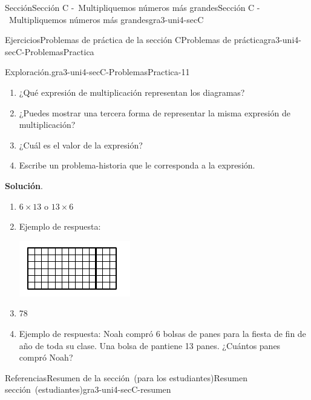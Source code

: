 \documentclass[oneside,10pt,]{article}
\newcommand{\blocktitlefont}{\relax}
\begin{document}
\begin{sectionptx}{Sección}{Sección C -~Multipliquemos números más grandes}{}{Sección C -~Multipliquemos números más grandes}{}{}{gra3-uni4-secC}
\begin{exercises-subsection}{Ejercicios}{Problemas de práctica de la sección C}{}{Problemas de práctica}{}{}{gra3-uni4-secC-ProblemasPractica}
\begin{divisionexercise}{9}{Exploración.}{}{gra3-uni4-secC-ProblemasPractica-11}
\begin{sidebyside}{2}{0.025}{0.025}{0.05}
\begin{sbspanel}{0.45}
\end{sbspanel}%
\end{sidebyside}%
%
\begin{enumerate}[label={(\alph*)}]
\item{}¿Qué expresión de multiplicación representan los diagramas?%
\item{}¿Puedes mostrar una tercera forma de representar la misma expresión de multiplicación?%
\item{}¿Cuál es el valor de la expresión?%
\item{}Escribe un problema-historia que le corresponda a la expresión.%
\end{enumerate}
\par\smallskip%
\noindent\textbf{\blocktitlefont Solución}.\hypertarget{gra3-uni4-secC-ProblemasPractica-11-3}{}\quad{}%
\begin{enumerate}[label={(\alph*)}]
\item{}\(6 \times 13\) o \(13 \times 6\)%
\item{}Ejemplo de respuesta:%
\begin{image}{0}{1}{0}{}%
\includegraphics[width=\linewidth]{external/svg-source/tikz-file-152442.pdf}
\end{image}%
\item{}78%
\item{}Ejemplo de respuesta: Noah compró 6 bolsas de panes para la fiesta de fin de año de toda su clase. Una bolsa de pantiene 13 panes. ¿Cuántos panes compró Noah?%
\end{enumerate}
\end{divisionexercise}%
\end{exercises-subsection}
%
%
\typeout{************************************************}
\typeout{************************************************}
%
\begin{references-subsection}{Referencias}{Resumen de la sección~(para los estudiantes)}{}{Resumen sección~(estudiantes)}{}{}{gra3-uni4-secC-resumen}

\end{references-subsection}
\end{sectionptx}
\end{document}
